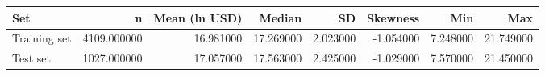 \begin{tabular}{lrrrrrrr}
\toprule
Set & n & Mean (ln USD) & Median & SD & Skewness & Min & Max \\
\midrule
Training set & 4109.000000 & 16.981000 & 17.269000 & 2.023000 & -1.054000 & 7.248000 & 21.749000 \\
Test set & 1027.000000 & 17.057000 & 17.563000 & 2.425000 & -1.029000 & 7.570000 & 21.450000 \\
\bottomrule
\end{tabular}
